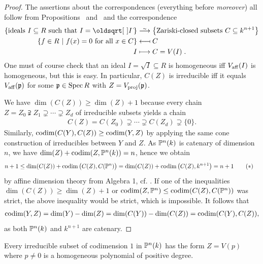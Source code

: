 \documentclass[a4paper,parskip=half,numbers=enddot, DIV=12]{scrreprt}
\begin{document}
\begin{proof}
The assertions about the correspondences (everything before \emph{moreover}) all follow from Propositions~
and~ and the correspondence
\begin{align*}
\left\{\text{ideals }I\subseteq R\text{ such that }I=\sqrt I\right\}&\isomorphism\left\{\text{Zariski-closed subsets }C\subseteq k^{n+1}\right\}\\
\left\{f\in R\st f(x)=0\text{ for all }x\in C\right\} &\longmapsfrom C\\
I&\longmapsto C=V(I)\;.
\end{align*}
One must of course check that an ideal $I=\sqrt I\subseteq R$ is homogeneous iff $V_{\mathrm{aff}}(I)$ is homogeneous, but this is easy. In particular, $C(Z)$ is irreducible iff it equals $V_{\mathrm{aff}}(\mathfrak{p})$ for some $\mathfrak{p} \in \operatorname{Spec} R$ with $Z=V_{\mathrm{proj}}(\mathfrak{p})$.

We have $\dim(C(Z))\geq \dim(Z)+1$ because every chain $Z = Z_0 \supsetneqq Z_1\supsetneq \cdots\supsetneq Z_d$
of irreducible subsets yields a chain
\begin{align*}
C(Z) = C(Z_0) \supsetneq \cdots\supsetneq C(Z_d)\supsetneq \{0\}.
\end{align*}
Similarly, $\operatorname{codim}(C(Y),C(Z)) \geq \operatorname{codim}(Y,Z)$ by applying the same cone construction of irreducibles between $Y$ and $Z$.
As $\mathbb{P}^n(k)$ is catenary of dimension $n$, we have $\dim(Z) + \operatorname{codim}(Z,\mathbb{P}^n(k)) = n$, hence we obtain
\begin{align*}\lbl{eq:proofAffineConeCorrespondenceAst}
&n+1\leq \dim(C(Z)) + \codim\big(C(Z),C(\IP^n)\big) = \dim(C(Z)) + \codim\big(C(Z),k^{n+1}\big) = n+1\tag{$\ast$}
\end{align*}
by affine dimension theory from Algebra 1, cf. \cite[Theorem~5]{alg1}.
If one of the inequalities $\dim(C(Z))\geq \dim(Z)+1$ or $\operatorname{codim}(Z,\mathbb{P}^n) \leq \operatorname{codim}(C(Z), C(\mathbb{P}^n))$ was strict,
the above inequality  would be strict, which is impossible. It follows that
\begin{align*}
\operatorname{codim}(Y,Z) = \dim(Y)-\dim(Z) = \dim(C(Y)) - \dim(C(Z)) = \operatorname{codim}(C(Y),C(Z)),
\end{align*}
as both $\mathbb{P}^n(k)$ and $k^{n+1}$ are catenary.
\end{proof}
\begin{cor}
Every irreducible %
subset of codimension $1$ in $\mathbb{P}^n(k)$ has the form $Z = V(p)$ where $p\neq 0$ is a homogeneous polynomial of positive degree.
\end{cor}
\end{document}
